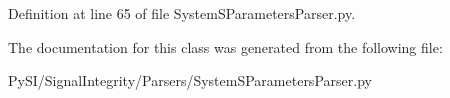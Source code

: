 Definition at line 65 of file System\+S\+Parameters\+Parser.\+py.



The documentation for this class was generated from the following file\+:\begin{DoxyCompactItemize}
\item 
Py\+S\+I/\+Signal\+Integrity/\+Parsers/System\+S\+Parameters\+Parser.\+py\end{DoxyCompactItemize}
